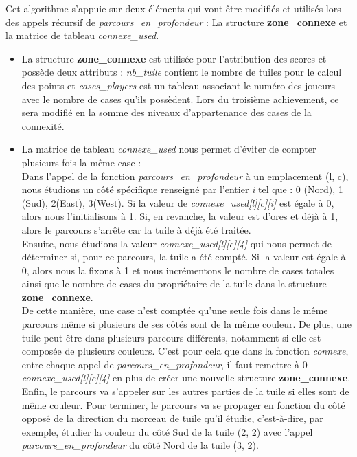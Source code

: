 \documentclass[a4paper]{article}
\begin{document}
Cet algorithme s'appuie sur deux éléments qui vont être modifiés et utilisés lors des appels récursif de \emph{parcours\_en\_profondeur} : La structure \textbf{zone\_connexe} et la matrice de tableau \emph{connexe\_used}.
\begin{itemize}
\item  La structure \textbf{zone\_connexe} est utilisée pour l'attribution des scores et possède deux attributs : \emph{nb\_tuile} contient le nombre de tuiles pour le calcul des points et \emph{ cases\_players} est un tableau associant le numéro des joueurs avec le nombre de cases qu'ils possèdent. Lors du troisième achievement, ce sera modifié en la somme des niveaux d'appartenance des cases de la connexité. \\
  
\item La matrice de tableau \emph{connexe\_used} nous permet d'éviter de compter plusieurs fois la même case : \\
  Dans l'appel de la fonction \emph{parcours\_en\_profondeur} à un emplacement (l, c), nous étudions un côté spécifique renseigné par l'entier \emph{i} tel que : 0 (Nord), 1 (Sud), 2(East), 3(West). Si la valeur de \emph{connexe\_used[l][c][i]} est égale à 0, alors nous l'initialisons à 1. Si, en revanche, la valeur est d'ores et déjà à 1, alors le parcours s'arrête car la tuile à déjà été traitée. \\
  
  Ensuite, nous étudions la valeur \emph{connexe\_used[l][c][4]} qui nous permet de déterminer si, pour ce parcours, la tuile a été compté. Si la valeur est égale à 0, alors nous la fixons à 1 et nous incrémentons le nombre de cases totales ainsi que le nombre de cases du propriétaire de la tuile dans la structure \textbf{zone\_connexe}. \\

De cette manière, une case n'est comptée qu'une seule fois dans le même parcours même si plusieurs de ses côtés sont de la même couleur. De plus, une tuile peut être dans plusieurs parcours différents, notamment si elle est composée de plusieurs couleurs. C'est pour cela que dans la fonction \emph{connexe}, entre chaque appel de \emph{parcours\_en\_profondeur}, il faut remettre à 0 \emph{connexe\_used[l][c][4]} en plus de créer une nouvelle structure \textbf{zone\_connexe}. \\
    
Enfin, le parcours va s'appeler sur les autres parties de la tuile si elles sont de même couleur. Pour terminer, le parcours va se propager en fonction du côté opposé de la direction du morceau de tuile qu'il étudie, c'est-à-dire, par exemple, étudier la couleur du côté Sud de la tuile (2, 2) avec l'appel \emph{parcours\_en\_profondeur} du côté Nord de la tuile (3, 2).
\end{itemize}
\end{document}
